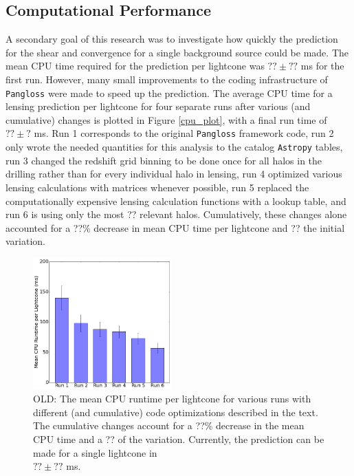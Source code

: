\documentclass[%
 reprint,
 amsmath,amssymb,
 aps,nofootinbib
]{revtex4-1}
\begin{document}
\subsection{Computational Performance}

A secondary goal of this research was to investigate how quickly the prediction for the shear and convergence for a single background source could be made. The mean CPU time required for the prediction per lightcone was ${??\pm??}$ ms for the first run. However, many small improvements to the coding infrastructure of \texttt{Pangloss} were made to speed up the prediction. The average CPU time for a lensing prediction per lightcone for four separate runs after various (and cumulative) changes is plotted in Figure \ref{cpu_plot}, with a final run time of $??\pm?$ ms. Run 1 corresponds to the original \texttt{Pangloss} framework code, run 2 only wrote the needed quantities for this analysis to the catalog \texttt{Astropy} tables, run 3 changed the redshift grid binning to be done once for all halos in the drilling rather than for every individual halo in lensing, run 4 optimized various lensing calculations with matrices whenever possible, run 5 replaced the computationally expensive lensing calculation functions with a lookup table, and run 6 is using only the most ?? relevant halos. Cumulatively, these changes alone accounted for a ??\% decrease in mean CPU time per lightcone and ?? the initial variation.

\begin{figure}
    \centering
    \includegraphics[width=0.475\textwidth]{figs-swe/thesis/profile_bar.png}
    \captionsetup{justification=raggedright,singlelinecheck=false}
    \caption{OLD: The mean CPU runtime per lightcone for various runs with different (and cumulative) code optimizations described in the text. The cumulative changes account for a ??\% decrease in the mean CPU time and a ?? of the variation. Currently, the prediction can be made for a single lightcone in\\$??\pm??$ ms.}
    \label{fig:cpu_plot}
\end{figure}
\end{document}
